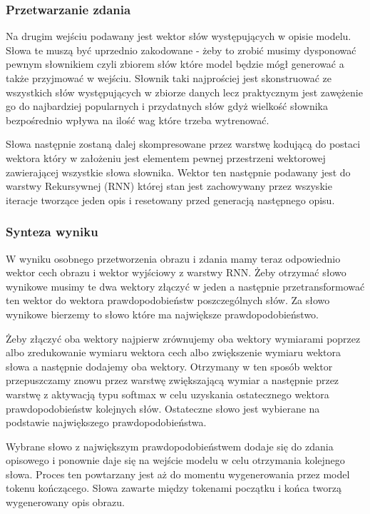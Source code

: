 \subsubsection{Przetwarzanie zdania}
Na drugim wejściu podawany jest wektor słów występujących w opisie modelu. Słowa te muszą być uprzednio zakodowane - żeby to zrobić musimy dysponować pewnym słownikiem czyli zbiorem słów które model będzie mógł generować a także przyjmować w wejściu. Słownik taki najprościej jest skonstruować ze wszystkich słów występujących w zbiorze danych lecz praktycznym jest zawężenie go do najbardziej popularnych i przydatnych słów gdyż wielkość słownika bezpośrednio wpływa na ilość wag które trzeba wytrenować.

Słowa następnie zostaną dalej skompresowane przez warstwę kodującą do postaci wektora który w założeniu jest elementem pewnej przestrzeni wektorowej zawierającej wszystkie słowa słownika. Wektor ten następnie podawany jest do warstwy Rekursywnej (RNN) której stan jest zachowywany przez wszyskie iteracje tworzące jeden opis i resetowany przed generacją następnego opisu.
\subsubsection{Synteza wyniku}
W wyniku osobnego przetworzenia obrazu i zdania mamy teraz odpowiednio wektor cech obrazu i wektor wyjściowy z warstwy RNN. Żeby otrzymać słowo wynikowe musimy te dwa wektory złączyć w jeden a następnie przetransformować ten wektor do wektora prawdopodobieństw poszczególnych słów. Za słowo wynikowe bierzemy to słowo które ma największe prawdopodobieństwo.


Żeby złączyć oba wektory najpierw zrównujemy oba wektory wymiarami poprzez albo zredukowanie wymiaru wektora cech albo zwiększenie wymiaru wektora słowa a następnie dodajemy oba wektory. Otrzymany w ten sposób wektor przepuszczamy znowu przez warstwę zwiększającą wymiar a następnie przez warstwę z aktywacją typu softmax w celu uzyskania ostatecznego wektora prawdopodobieństw kolejnych słów. Ostateczne słowo jest wybierane na podstawie największego prawdopodobieństwa.

Wybrane słowo z największym prawdopodobieństwem dodaje się do zdania opisowego i ponownie daje się na wejście modelu w celu otrzymania kolejnego słowa. Proces ten powtarzany jest aż do momentu wygenerowania przez model tokenu kończącego. Słowa zawarte między tokenami początku i końca tworzą wygenerowany opis obrazu.


